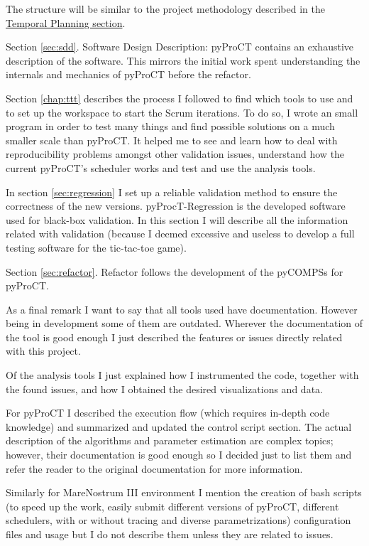 The structure will be similar to the project methodology described in the \hyperref[sec:temporal_planning]{Temporal Planning section}.

Section \ref{sec:sdd}. Software Design Description: pyProCT contains an exhaustive description of the software. This mirrors the initial work spent understanding the internals and mechanics of pyProCT before the refactor.

Section \ref{chap:ttt} describes the process I followed to find which tools to use and to set up the workspace to start the Scrum iterations. To do so, I wrote an small program in order to test many things and find possible solutions on a much smaller scale than pyProCT. It helped me to see and learn how to deal with reproducibility problems amongst other validation issues, understand how the current pyProCT's scheduler works and test and use the analysis tools. 

In section \ref{sec:regression} I set up a reliable validation method to ensure the correctness of the new versions. pyProcT-Regression is the developed software used for black-box validation. In this section I will describe all the information related with validation (because I deemed excessive and useless to develop a full testing software for the tic-tac-toe game).

Section \ref{sec:refactor}. Refactor follows the development of the pyCOMPSs for pyProCT.


As a final remark I want to say that all tools used have documentation. However being in development some of them are outdated. Wherever the documentation of the tool is good enough I just described the features or issues directly related with this project. 

Of the analysis tools I just explained how I instrumented the code, together with the found issues, and how I obtained the desired visualizations and data.

For pyProCT I described the execution flow (which requires in-depth code knowledge) and summarized and updated the control script section. The actual description of the algorithms and parameter estimation are complex topics; however, their documentation is good enough so I decided just to list them and refer the reader to the original documentation for more information.

Similarly for MareNostrum III environment I mention the creation of bash scripts (to speed up the work, easily submit different versions of pyProCT, different schedulers, with or without tracing and diverse parametrizations) configuration files and usage but I do not describe them unless they are related to issues.

